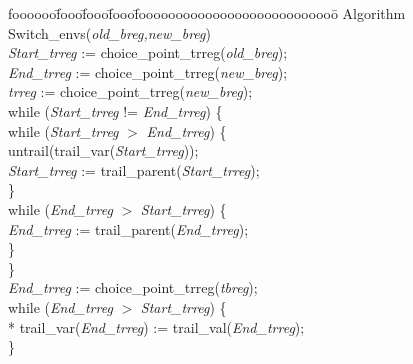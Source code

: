 
\vspace*{\itemsep}
\longline
\begin{sf}
\begin{tabbing}
  foooooo\=fooo\=fooo\=fooo\=fooooooooooooooooooooooooooo\=\kill
  \> Algorithm Switch\_envs({\em old\_breg,new\_breg}) \\
  \> \> {\em Start\_trreg} := choice\_point\_trreg({\em old\_breg}); \\
  \> \> {\em End\_trreg} :=  choice\_point\_trreg({\em new\_breg}); \\
  \> \> {\em trreg} := choice\_point\_trreg({\em new\_breg}); \\
  \> \> while ({\em Start\_trreg} != {\em End\_trreg}) \{ \\
  \> \> \> while ({\em Start\_trreg} $>$ {\em End\_trreg}) \{ \\
  \> \> \> \>  untrail(trail\_var({\em Start\_trreg})); \\
  \> \> \> \>  {\em Start\_trreg} := trail\_parent({\em Start\_trreg}); \\
  \> \> \> \} \\
  \> \> \> while ({\em End\_trreg} $>$ {\em Start\_trreg}) \{ \\
  \> \> \> \>   {\em End\_trreg} := trail\_parent({\em End\_trreg}); \\
  \> \> \> \} \\
  \> \> \} \\
  \> \> {\em End\_trreg} := choice\_point\_trreg({\em tbreg}); \\
  \> \> while ({\em End\_trreg} $>$ {\em Start\_trreg}) \{ \\
  \> \> \> * trail\_var({\em End\_trreg}) := trail\_val({\em End\_trreg}); \\
  \> \> \}
\end{tabbing}
\end{sf}
\longline
\vspace*{\itemsep}


